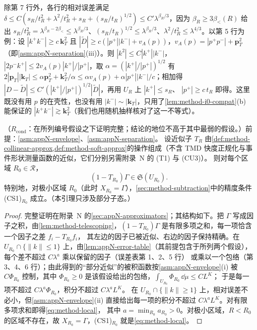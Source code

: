 除第 7 行外，各行的相对误差满足 $\delta\le C(s_R/t_R^2+\lambda^2/t_R^2+s_R+(s_R/t_R)^{1/2})\le C'\lambda^{\beta_R/3}$，因为 $\beta_R\ge3\beta_<(R)$ 给出
$s_R/t_R^2=\lambda^{\beta_R-2\beta_<}\le\lambda^{\beta_R/3}$、$(s_R/t_R)^{1/2}\le\lambda^{\beta_R/3}$、$\lambda^2/t_R^2\le\lambda^{4/3}$。以第 5 行为例：设 $|k^+k^-|\ge c\,\mathbf k_T^2$ 且
$|\tilde D|\ge c(|p^+||k^-|+v_A(p))$，$v_A(p)=|p^+p^-|+\mathbf p_T^2$（即\cref{asm:appN-separation}(iii)）。则 $|k^2|\le C|k^+||k^-|$，$|2p^-k^+|\le2v_A(p)|k^+|/|p^+|$，取 $\alpha=(|k^+|/|p^+|)^{1/2}$ 有
$2|\mathbf p_T||\mathbf k_T|\le\alpha\mathbf p_T^2+\mathbf k_T^2/\alpha\le\alpha v_A(p)+\alpha|p^+||k^-|/c$；相加得 $|D-\tilde D|\le C'(|k^+|/|p^+|)^{1/2}|\tilde D|$，再用 $U_R$ 上 $|k^+|\le s_R$、
$|p^+|\ge c\,t_R$ 即得。这里既没有用 $p$ 的在壳性，也没有用 $|k^-|\sim|\mathbf k_T|$，只用了\cref{lem:method-i0-compat}(b) 能保证的 $|k^+k^-|\gtrsim\mathbf k_T^2$（我们也用随机抽样核对了这一不等式）。%

\begin{lemma}\label{lem:method-local-accuracy}
（$R_{\mathrm{cond}}$：在所列编号假设之下证明完整；结论的地位不高于其中最弱的假设。）前提：\cref{asm:appN-envelope}、\cref{asm:appN-separation}。
设近似子 $T_R$ 由\cref{def:method-collinear-approx,def:method-soft-approx}的操作组成（不含 TMD 快度正规化与事件形状测量函数的近似，它们分别另需附录~N 的 (T1) 与 (CU3)）。
则对每个区域 $R_0\in\mathcal R$，
\begin{equation}\label{eq:method-local}
(1-T_{R_0})\Gamma\in\mathfrak S(U_{R_0}) .
\end{equation}
特别地，对极小区域 $R_0$（此时 $X_{R_0}=\Gamma$），\cref{sec:method-subtraction}中的精度条件 (CS1)$_{R_0}$ 成立。（本引理只涉及部分子态。）
\end{lemma}

\begin{proof}
完整证明在附录~N 的\cref{sec:appN-approximators}；其结构如下。把 $\Gamma$ 写成因子之积，由\cref{lem:method-telescoping}，$(1-T_{R_0})\Gamma$ 是有限多项之和，每一项恰含一个因子之差 $f_i-T_{R_0}f_i$，
其左边的因子已被近似、右边的因子保持精确。在 $U_{R_0}\cap\{\|k\|\le1\}$ 上，由\cref{lem:appN-error-table}（其前提包含于所列两个假设），每个差不超过 $C\lambda^a$ 乘以保留的因子（误差表第 1、2、5 行）
或乘以一个包络（第 3、4、6 行）；由此得到的“部分近似”的被积函数按\cref{asm:appN-envelope}(i) 被 $C\Phi_{R_0}$ 控制，其中 $\Phi_{R_0}\ge0$ 是该假设给出的包络，$\int_{U_{R_0}}\Phi_{R_0}\,\dd\mu\le CL^K$；
于是每一项不超过 $C\lambda^a\Phi_{R_0}$，积分不超过 $C\lambda^aL^K$。
在 $U_{R_0}\cap\{\|k\|\ge1\}$ 上，相对误差不必小，但\cref{asm:appN-envelope}(ii) 直接给出每一项的积分不超过 $C\lambda^aL^K$。对有限多项求和即得\cref{eq:method-local}，
其中 $a=\min_{R_0}a_{R_0}>0$。对极小区域，$R<R_0$ 的区域不存在，故 $X_{R_0}=\Gamma$，(CS1)$_{R_0}$ 就是\cref{eq:method-local}。
\end{proof}

